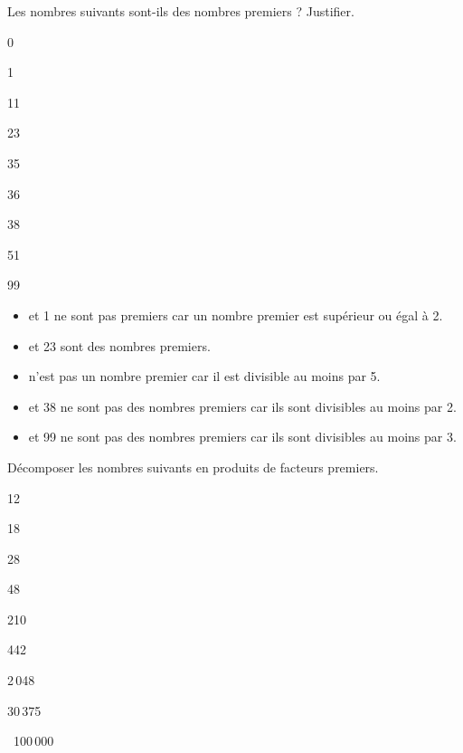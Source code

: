 \exercicesbase

\begin{colonne*exercice}

\begin{exercice} %
   Les nombres suivants sont-ils des nombres premiers ? Justifier.
   \begin{colenumerate}{3}
      \item 0 \smallskip
      \item 1 \smallskip
      \item 11
      \item 23
      \item 35
      \item 36 
      \item 38 
      \item 51 
      \item 99
   \end{colenumerate}
\end{exercice}
 
\begin{corrige}
   \begin{itemize}
      \item { et 1} ne sont pas premiers car un nombre premier est supérieur ou égal à 2. 
      \item { et 23} sont des nombres premiers.
      \item {} n'est pas un nombre premier car il est divisible au moins par 5.
      \item { et 38} ne sont pas des nombres premiers car ils sont divisibles au moins par 2.
      \item { et 99} ne sont pas des nombres premiers car ils sont divisibles au moins par 3.
   \end{itemize}
\end{corrige}

\bigskip


\begin{exercice} %
   Décomposer les nombres suivants en produits de facteurs premiers.
   \begin{colenumerate}{3}
      \item 12 \smallskip
      \item 18 \smallskip
      \item 28 \smallskip
      \item 48
      \item 210
      \item 442
      \item 2\,048
      \item 30\,375
      \item \, 100\,000
   \end{colenumerate}
\end{exercice}


\end{colonne*exercice}
